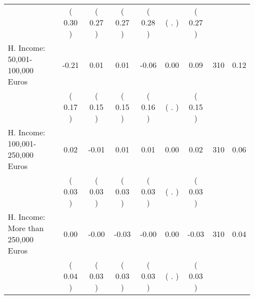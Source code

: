 \begin{tabular}{lcccccccc}
 & (     0.30 ) & (     0.27 ) & (     0.27 ) & (     0.28 ) & (        . ) & (     0.27 ) & \\
H. Income: 50,001-100,000 Euros &     -0.21 &      0.01 &      0.01 &     -0.06 &      0.00 &      0.09 & 310 &       0.12 \\ 
 & (     0.17 ) & (     0.15 ) & (     0.15 ) & (     0.16 ) & (        . ) & (     0.15 ) & \\
H. Income: 100,001-250,000 Euros &      0.02 &     -0.01 &      0.01 &      0.01 &      0.00 &      0.02 & 310 &       0.06 \\ 
 & (     0.03 ) & (     0.03 ) & (     0.03 ) & (     0.03 ) & (        . ) & (     0.03 ) & \\
H. Income: More than 250,000 Euros &      0.00 &     -0.00 &     -0.03 &     -0.00 &      0.00 &     -0.03 & 310 &       0.04 \\ 
 & (     0.04 ) & (     0.03 ) & (     0.03 ) & (     0.03 ) & (        . ) & (     0.03 ) & \\
\bottomrule
\end{tabular}
